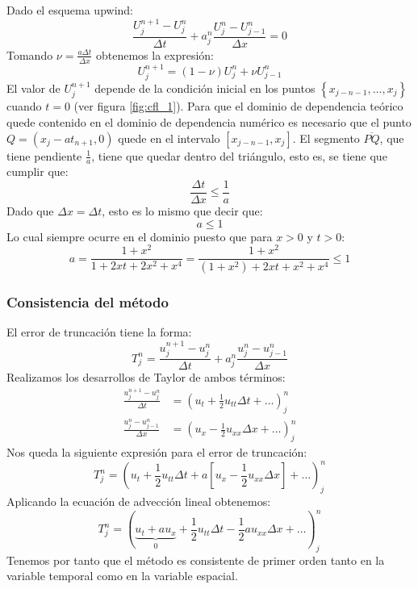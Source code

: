 \documentclass[spanish]{mathnotes}
\begin{document}
	\noindent Dado el esquema upwind:
	$$\frac{U_{j}^{n+1}-U_{j}^{n}}{\Delta t} + a_j^n\frac{U_{j}^{n}-U_{j-1}^{n}}{\Delta x} = 0$$
	Tomando $\nu = \frac{a \Delta t}{\Delta x}$ obtenemos la expresión:
	$$U_j^{n+1} = (1-\nu)U_j^n + \nu U_{j-1}^n$$
	El valor de $U_j^{n+1}$ depende de la condición inicial en los puntos $\left\{x_{j-n-1}, \hdots, x_j\right\}$ cuando $t=0$ (ver figura \ref{fig:cfl_1}).
	Para que el dominio de dependencia teórico quede contenido en el dominio de dependencia numérico es necesario que el punto $Q=(x_j-at_{n+1}, 0)$ quede en el intervalo $[x_{j-n-1}, x_j]$. El segmento $\overline{PQ}$, que tiene pendiente $\frac{1}{a}$, tiene que quedar dentro del triángulo, esto es, se tiene que cumplir que:
	$$\frac{\Delta t}{\Delta x} \le \frac{1}{a}$$
	Dado que $\Delta x = \Delta t$, esto es lo mismo que decir que:
	$$a \le 1$$
	Lo cual siempre ocurre en el dominio puesto que para $x>0$ y $t>0$:
	$$a = \frac{1+x^2}{1+2xt+2x^2+x^4} =  \frac{1+x^2}{(1+x^2)+2xt+x^2+x^4} \le 1$$
	\subsubsection{Consistencia del método}
	El error de truncación tiene la forma:
	$$T_j^n = \frac{u_{j}^{n+1}-u_{j}^{n}}{\Delta t} + a_j^n\frac{u_{j}^{n}-u_{j-1}^{n}}{\Delta x}$$
	Realizamos los desarrollos de Taylor de ambos términos:
	\begin{align*}
	\frac{u_{j}^{n+1}-u_{j}^{n}}{\Delta t} &= (u_t + \frac{1}{2}u_{tt}\Delta t+\hdots)_j^n\\
	\frac{u_{j}^{n}-u_{j-1}^{n}}{\Delta x} &= (u_x - \frac{1}{2}u_{xx}\Delta x+\hdots)_j^n
	\end{align*}
	Nos queda la siguiente expresión para el error de truncación:
	$$T_j^n = \left(u_t+\frac{1}{2} u_{tt}\Delta t+ a \left[u_{x}-\frac{1}{2} u_{xx}\Delta x\right]+\hdots\right)_j^n$$
	Aplicando la ecuación de advección lineal obtenemos:
	$$T_j^n = \left( \underbrace{u_t+au_x}_{0}+\frac{1}{2} u_{tt}\Delta t-\frac{1}{2} a u_{xx}\Delta x+\hdots\right)_j^n$$
	Tenemos por tanto que el método es consistente de primer orden tanto en la variable temporal como en la variable espacial.	
\end{document}
